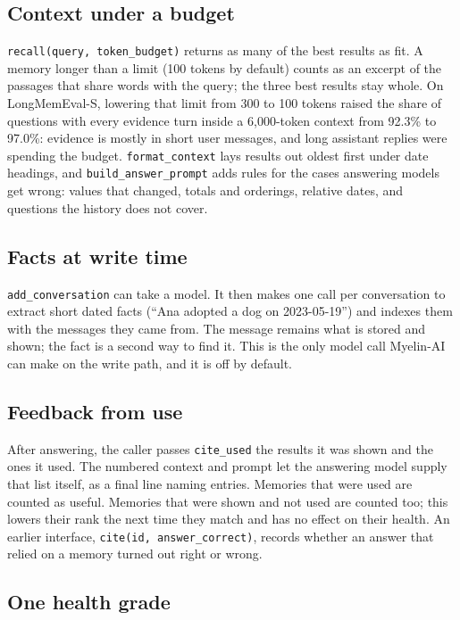 \documentclass[11pt]{article}
\begin{document}
\subsection{Context under a budget}

\texttt{recall(query, token\_budget)} returns as many of the best
results as fit. A memory longer than a limit (100 tokens by default)
counts as an excerpt of the passages that share words with the query;
the three best results stay whole. On LongMemEval-S, lowering that
limit from 300 to 100 tokens raised the share of questions with every
evidence turn inside a 6{,}000-token context from 92.3\% to 97.0\%:
evidence is mostly in short user messages, and long assistant replies
were spending the budget. \texttt{format\_context} lays results out
oldest first under date headings, and \texttt{build\_answer\_prompt}
adds rules for the cases answering models get wrong: values that
changed, totals and orderings, relative dates, and questions the
history does not cover.

\subsection{Facts at write time}

\texttt{add\_conversation} can take a model. It then makes one call
per conversation to extract short dated facts (``Ana adopted a dog on
2023-05-19'') and indexes them with the messages they came from. The
message remains what is stored and shown; the fact is a second way to
find it. This is the only model call \mbox{Myelin-AI} can make on the write
path, and it is off by default.

\subsection{Feedback from use}

After answering, the caller passes \texttt{cite\_used} the results it
was shown and the ones it used. The numbered context and prompt let
the answering model supply that list itself, as a final line naming
entries. Memories that were used are counted as useful. Memories that
were shown and not used are counted too; this lowers their rank the
next time they match and has no effect on their health. An earlier
interface, \texttt{cite(id, answer\_correct)}, records whether an
answer that relied on a memory turned out right or wrong.

\subsection{One health grade}
\label{sec:health}
\end{document}
